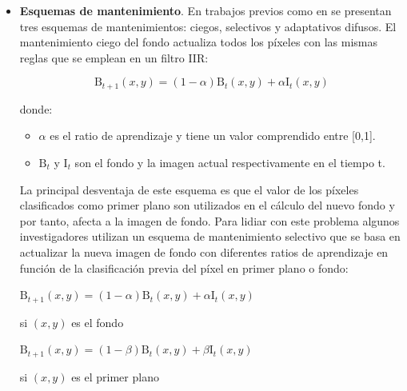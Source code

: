 \begin{itemize}
    \item \textbf{Esquemas de mantenimiento}. En trabajos previos como en \cite{4712338} se presentan tres esquemas de mantenimientos: ciegos, selectivos y adaptativos difusos. El mantenimiento ciego del fondo actualiza todos los píxeles con las mismas reglas que se emplean en un filtro IIR:
    
    \begin{equation}
    \label{eq:IIR-filter}
    \text{B}_{t+1}(x,y) = (1 - \alpha)\text{B}_{t}(x,y) + \alpha\text{I}_{t}(x,y)
    \end{equation}
    
    donde:
    
    \begin{itemize}
        \item $\alpha$ es el ratio de aprendizaje y tiene un valor comprendido entre [0,1].
        \item $\text{B}_{t}$ y $\text{I}_{t}$ son el fondo y la imagen actual respectivamente en el tiempo t.
    \end{itemize}
    
    La principal desventaja de este esquema es que el valor de los píxeles clasificados como primer plano son utilizados en el cálculo del nuevo fondo y por tanto, afecta a la imagen de fondo. Para lidiar con este problema algunos investigadores utilizan un esquema de mantenimiento selectivo que se basa en actualizar la nueva imagen de fondo con diferentes ratios de aprendizaje en función de la clasificación previa del píxel en primer plano o fondo:
    
    \vspace{0.5cm}

    $\text{B}_{t+1}(x,y) = (1 - \alpha)\text{B}_{t}(x,y) + \alpha\text{I}_{t}(x,y)$
    
    \vspace{0.5cm}
    
    si $(x,y)$ es el fondo
    
    \vspace{0.5cm}

    $\text{B}_{t+1}(x,y) = (1 - \beta)\text{B}_{t}(x,y) + \beta\text{I}_{t}(x,y)$
    
    \vspace{0.5cm}
    
    si $(x,y)$ es el primer plano
    
    \vspace{0.5cm}
    

\end{itemize}
